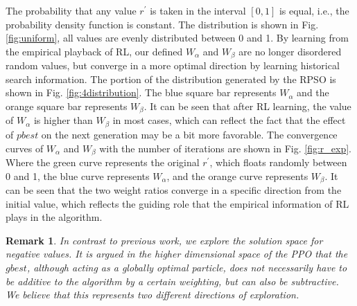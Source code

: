 \documentclass[review]{elsarticle}
\newtheorem{remark}{Remark}
\begin{document}
The probability that any value $r^{\prime}$ is taken in the interval $[0, 1]$ is equal, i.e., the probability density function is constant. The distribution is shown in Fig. \ref{fig:uniform}, all values are evenly distributed between 0 and 1. By learning from the empirical playback of RL, our defined $W_{\alpha}$ and $W_{\beta}$ are no longer disordered random values, but converge in a more optimal direction by learning historical search information. The portion of the distribution generated by the RPSO is shown in Fig. \ref{fig:4distribution}. The blue square bar represents $W_{\alpha}$ and the orange square bar represents $W_{\beta}$. It can be seen that after RL learning, the value of $W_{\alpha}$ is higher than $W_{\beta}$ in most cases, which can reflect the fact that the effect of $pbest$ on the next generation may be a bit more favorable. The convergence curves of $W_{\alpha}$ and $W_{\beta}$ with the number of iterations are shown in Fig. \ref{fig:r_exp}. Where the green curve represents the original $r^{\prime}$, which floats randomly between 0 and 1, the blue curve represents $W_{\alpha}$, and the orange curve represents $W_{\beta}$. It can be seen that the two weight ratios converge in a specific direction from the initial value, which reflects the guiding role that the empirical information of RL plays in the algorithm.
\begin{remark}
	\emph{In contrast to previous work, we explore the solution space for negative values. It is argued in the higher dimensional space of the PPO that the $gbest$, although acting as a globally optimal particle, does not necessarily have to be additive to the algorithm by a certain weighting, but can also be subtractive. We believe that this represents two different directions of exploration.}
\end{remark}
\end{document}
